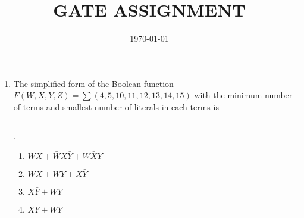 \documentclass[12pt]{article}
\title{GATE ASSIGNMENT}
\date{\today}
\begin{document}


\begin{enumerate}
    \item The simplified form of the Boolean function $F(W,X,Y,Z)=\sum(4,5,10,11,12,13,14,15)$ with the minimum number of terms and smallest number of literals in each terms is \rule{60pt}{1pt}.
\begin{enumerate}
    \item $WX+\bar WX\bar Y+W\bar XY$
    \item $WX+WY+X\bar Y$
    \item $X\bar Y+WY$
    \item $\bar XY+\bar W\bar Y$
\end{enumerate}
\end{enumerate}
    
\end{document}
